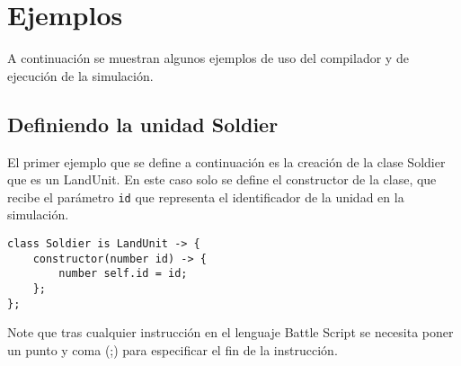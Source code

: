 \section{Ejemplos}

A continuación se muestran algunos ejemplos de uso del compilador y de ejecución de la simulación.

\subsection{Definiendo la unidad Soldier}

El primer ejemplo que se define a continuación es la creación de la clase Soldier que es un LandUnit. En este caso solo se define el constructor de la clase, que recibe el parámetro \verb|id| que representa el identificador de la unidad en la simulación.

\begin{verbatim}
class Soldier is LandUnit -> {  
    constructor(number id) -> { 
        number self.id = id; 
    }; 
}; 
\end{verbatim}

Note que tras cualquier instrucción en el lenguaje Battle Script se necesita poner un punto y coma (;) para especificar el fin de la instrucción.